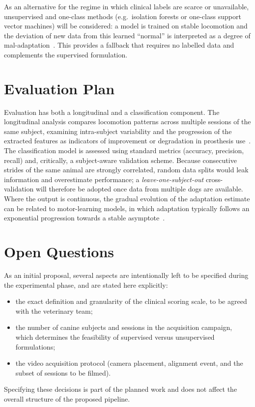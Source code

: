 As an alternative for the regime in which clinical labels are scarce or
unavailable, unsupervised and one-class methods (e.g.\ isolation forests or
one-class support vector machines) will be considered: a model is trained on
stable locomotion and the deviation of new data from this learned
``normal'' is interpreted as a degree of mal-adaptation~\cite{Otamendi2023}.
This provides a fallback that requires no labelled data and complements the
supervised formulation.

\section{Evaluation Plan}
\label{section:evaluation}

Evaluation has both a longitudinal and a classification component. The
longitudinal analysis compares locomotion patterns across multiple sessions of
the same subject, examining intra-subject variability and the progression of
the extracted features as indicators of improvement or degradation in
prosthesis use~\cite{Rosen2022,Wendland2019}. The classification model is
assessed using standard metrics (accuracy, precision, recall) and, critically,
a subject-aware validation scheme. Because consecutive strides of the same
animal are strongly correlated, random data splits would leak information and
overestimate performance; a \emph{leave-one-subject-out} cross-validation will
therefore be adopted once data from multiple dogs are available. Where the
output is continuous, the gradual evolution of the adaptation estimate can be
related to motor-learning models, in which adaptation typically follows an
exponential progression towards a stable asymptote~\cite{Reinkensmeyer2016}.

\section{Open Questions}
\label{section:open_questions}

As an initial proposal, several aspects are intentionally left to be specified
during the experimental phase, and are stated here explicitly:
\begin{itemize}
  \item the exact definition and granularity of the clinical scoring scale,
        to be agreed with the veterinary team;
  \item the number of canine subjects and sessions in the acquisition
        campaign, which determines the feasibility of supervised versus
        unsupervised formulations;
  \item the video acquisition protocol (camera placement, alignment event,
        and the subset of sessions to be filmed).
\end{itemize}
Specifying these decisions is part of the planned work and does not affect the
overall structure of the proposed pipeline.
